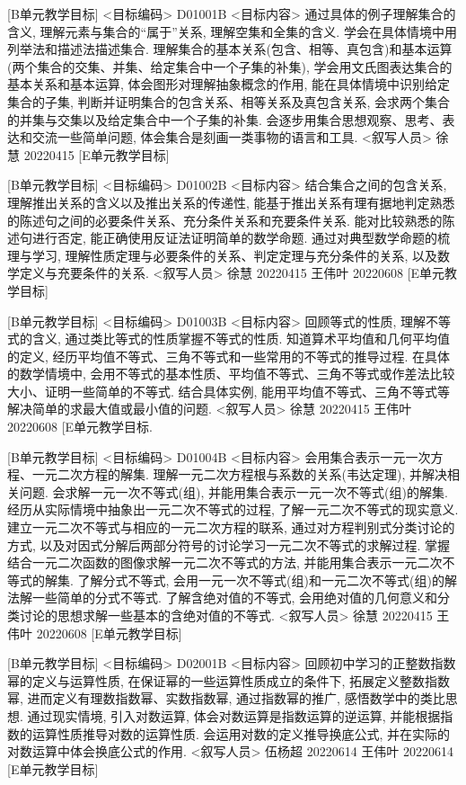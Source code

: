 \documentclass[10pt,a4paper]{article}
\begin{document}
[B单元教学目标]
<目标编码>
D01001B
<目标内容>
通过具体的例子理解集合的含义, 理解元素与集合的“属于”关系, 理解空集和全集的含义. 学会在具体情境中用列举法和描述法描述集合. 理解集合的基本关系(包含、相等、真包含)和基本运算(两个集合的交集、并集、给定集合中一个子集的补集), 学会用文氏图表达集合的基本关系和基本运算, 体会图形对理解抽象概念的作用, 能在具体情境中识别给定集合的子集, 判断并证明集合的包含关系、相等关系及真包含关系, 会求两个集合的并集与交集以及给定集合中一个子集的补集. 会逐步用集合思想观察、思考、表达和交流一些简单问题, 体会集合是刻画一类事物的语言和工具.
<叙写人员>
徐慧    20220415
[E单元教学目标]


[B单元教学目标]
<目标编码>
D01002B
<目标内容>
结合集合之间的包含关系, 理解推出关系的含义以及推出关系的传递性, 能基于推出关系有理有据地判定熟悉的陈述句之间的必要条件关系、充分条件关系和充要条件关系. 能对比较熟悉的陈述句进行否定, 能正确使用反证法证明简单的数学命题. 通过对典型数学命题的梳理与学习, 理解性质定理与必要条件的关系、判定定理与充分条件的关系, 以及数学定义与充要条件的关系.
<叙写人员>
徐慧    20220415
王伟叶  20220608
[E单元教学目标]


[B单元教学目标]
<目标编码>
D01003B
<目标内容>
回顾等式的性质, 理解不等式的含义, 通过类比等式的性质掌握不等式的性质. 知道算术平均值和几何平均值的定义, 经历平均值不等式、三角不等式和一些常用的不等式的推导过程. 在具体的数学情境中, 会用不等式的基本性质、平均值不等式、三角不等式或作差法比较大小、证明一些简单的不等式. 结合具体实例, 能用平均值不等式、三角不等式等解决简单的求最大值或最小值的问题.
<叙写人员>
徐慧    20220415
王伟叶  20220608
[E单元教学目标.



[B单元教学目标]
<目标编码>
D01004B
<目标内容>
会用集合表示一元一次方程、一元二次方程的解集. 理解一元二次方程根与系数的关系(韦达定理), 并解决相关问题. 会求解一元一次不等式(组), 并能用集合表示一元一次不等式(组)的解集. 经历从实际情境中抽象出一元二次不等式的过程, 了解一元二次不等式的现实意义. 建立一元二次不等式与相应的一元二次方程的联系, 通过对方程判别式分类讨论的方式, 以及对因式分解后两部分符号的讨论学习一元二次不等式的求解过程. 掌握结合一元二次函数的图像求解一元二次不等式的方法, 并能用集合表示一元二次不等式的解集. 了解分式不等式, 会用一元一次不等式(组)和一元二次不等式(组)的解法解一些简单的分式不等式. 了解含绝对值的不等式, 会用绝对值的几何意义和分类讨论的思想求解一些基本的含绝对值的不等式.
<叙写人员>
徐慧    20220415
王伟叶  20220608
[E单元教学目标]

[B单元教学目标]
<目标编码>
D02001B
<目标内容>
回顾初中学习的正整数指数幂的定义与运算性质, 在保证幂的一些运算性质成立的条件下, 拓展定义整数指数幂, 进而定义有理数指数幂、实数指数幂, 通过指数幂的推广, 感悟数学中的类比思想. 通过现实情境, 引入对数运算, 体会对数运算是指数运算的逆运算, 并能根据指数的运算性质推导对数的运算性质. 会运用对数的定义推导换底公式, 并在实际的对数运算中体会换底公式的作用.
<叙写人员>
伍杨超  20220614
王伟叶  20220614
[E单元教学目标]
 
\end{document}
